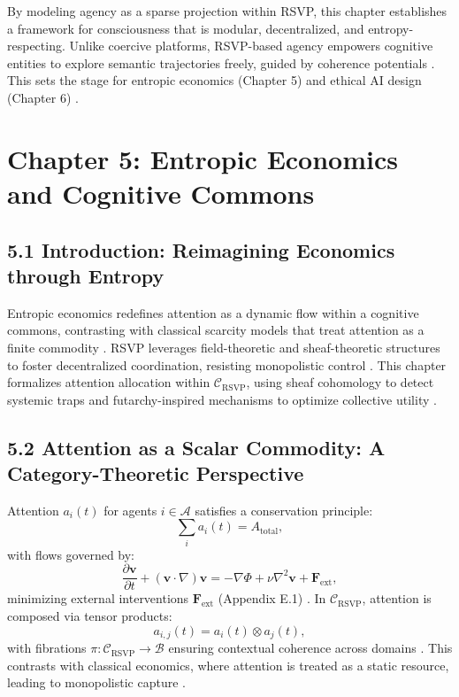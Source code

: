 \documentclass[12pt]{article}
\begin{document}
By modeling agency as a sparse projection within RSVP, this chapter establishes a framework for consciousness that is modular, decentralized, and entropy-respecting. Unlike coercive platforms, RSVP-based agency empowers cognitive entities to explore semantic trajectories freely, guided by coherence potentials \citep{ortega1957}. This sets the stage for entropic economics (Chapter 5) and ethical AI design (Chapter 6) \citep{hanson2003}.

\section*{Chapter 5: Entropic Economics and Cognitive Commons}

\subsection*{5.1 Introduction: Reimagining Economics through Entropy}

Entropic economics redefines attention as a dynamic flow within a cognitive commons, contrasting with classical scarcity models that treat attention as a finite commodity \citep{zuboff2019, hanson2003}. RSVP leverages field-theoretic and sheaf-theoretic structures to foster decentralized coordination, resisting monopolistic control \citep{lanier2018}. This chapter formalizes attention allocation within \(\mathcal{C}_{\text{RSVP}}\), using sheaf cohomology to detect systemic traps and futarchy-inspired mechanisms to optimize collective utility \citep{hatcher2002, hanson2003}.

\subsection*{5.2 Attention as a Scalar Commodity: A Category-Theoretic Perspective}

Attention \(a_i(t)\) for agents \(i \in \mathcal{A}\) satisfies a conservation principle:
\[
\sum_i a_i(t) = A_{\text{total}},
\]
with flows governed by:
\[
\frac{\partial \mathbf{v}}{\partial t} + (\mathbf{v} \cdot \nabla)\mathbf{v} = -\nabla \Phi + \nu \nabla^2 \mathbf{v} + \mathbf{F}_{\text{ext}},
\]
minimizing external interventions \(\mathbf{F}_{\text{ext}}\) (Appendix E.1) \citep{shannon1948}. In \(\mathcal{C}_{\text{RSVP}}\), attention is composed via tensor products:
\[
a_{i,j}(t) = a_i(t) \otimes a_j(t),
\]
with fibrations \(\pi: \mathcal{C}_{\text{RSVP}} \to \mathcal{B}\) ensuring contextual coherence across domains \citep{lawvere2009}. This contrasts with classical economics, where attention is treated as a static resource, leading to monopolistic capture \citep{cover2006, zuboff2019}.
\end{document}
